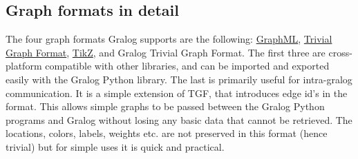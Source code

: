 \subsection{Graph formats in detail}
\label{graphFormatsInDetail}
The four graph formats Gralog supports are the following: \href{https://en.wikipedia.org/wiki/GraphML}{GraphML}, \href{https://en.wikipedia.org/wiki/Trivial\_Graph\_Format}{Trivial Graph Format}, \href{https://en.wikipedia.org/wiki/PGF/TikZ}{TikZ}, and Gralog Trivial Graph Format. The first three are cross-platform compatible with other libraries, and can be imported and exported easily with the Gralog Python library. The last is primarily useful for intra-gralog communication. It is a simple extension of TGF, that introduces edge id's in the format. This allows simple graphs to be passed between the Gralog Python programs and Gralog without losing any basic data that cannot be retrieved. The locations, colors, labels, weights etc. are not preserved in this format (hence trivial) but for simple uses it is quick and practical.



